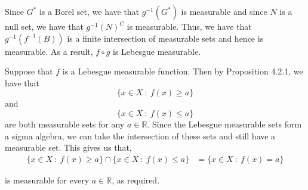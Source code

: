 \documentclass[12pt]{article}
\newenvironment{problem}[2][Problem]{\begin{trivlist}
\item[\hskip \labelsep {\bfseries #1}\hskip \labelsep {\bfseries #2.}]}{\end{trivlist}}
\begin{document}
Since $G^*$ is a Borel set, we have that $g^{-1}(G^*)$ is measurable and since $N$ is a null set, we have that $g^{-1}(N)^C$ is measurable. Thus, we have that $g^{-1}(f^{-1}(B))$ is a finite intersection of measurable sets and hence is measurable. As a result, $f \circ g$ is Lebesgue measurable.

\begin{problem}{9}
\end{problem}

Suppose that $f$ is a Lebesgue measurable function. Then by Proposition 4.2.1, we have that $$\{x \in X \ : \ f(x) \geq a\}$$ and $$\{x \in X \ : \ f(x) \leq a\}$$ are both measurable sets for any $a \in \mathbb{R}$. Since the Lebesgue measurable sets form a sigma algebra, we can take the intersection of these sets and still have a measurable set. This gives us that,
\begin{align*}
\{x \in X \ : \ f(x) \geq a\} \cap \{x \in X \ : \ f(x) \leq a\} &= \{x \in X \ : \ f(x) = a\}
\end{align*}

is measurable for every $a \in \mathbb{R}$, as required.

\begin{problem}{10}
\end{problem}
\end{document}
